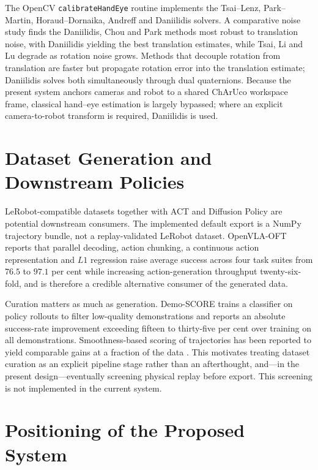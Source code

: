 The OpenCV \texttt{calibrateHandEye} routine implements the Tsai--Lenz,
Park--Martin, Horaud--Dornaika, Andreff and Daniilidis solvers. A comparative
noise study \cite{alihandeye} finds the Daniilidis, Chou and Park methods most
robust to translation noise, with Daniilidis yielding the best translation
estimates, while Tsai, Li and Lu degrade as rotation noise grows. Methods that
decouple rotation from translation are faster but propagate rotation error into
the translation estimate; Daniilidis solves both simultaneously through dual
quaternions. Because the present system anchors cameras and robot to a shared
ChArUco workspace frame, classical hand--eye estimation is largely bypassed;
where an explicit camera-to-robot transform is required, Daniilidis is used.

\section{Dataset Generation and Downstream Policies}
\label{sec:lit-dataset}

LeRobot-compatible datasets together with ACT and Diffusion Policy are
potential downstream consumers. The implemented default export is a NumPy
trajectory bundle, not a replay-validated LeRobot dataset. OpenVLA-OFT \cite{openvlaoft} reports that parallel decoding, action
chunking, a continuous action representation and $L1$ regression raise average
success across four task suites from $76.5$ to $97.1$ per cent while increasing
action-generation throughput twenty-six-fold, and is therefore a credible
alternative consumer of the generated data.

Curation matters as much as generation. Demo-SCORE \cite{demoscore} trains a
classifier on policy rollouts to filter low-quality demonstrations and reports
an absolute success-rate improvement exceeding fifteen to thirty-five per cent
over training on all demonstrations. Smoothness-based scoring of trajectories
has been reported to yield comparable gains at a fraction of the data
. This motivates treating dataset curation as an
explicit pipeline stage rather than an afterthought, and---in the present
design---eventually screening physical replay before export. This screening
is not implemented in the current system.

\section{Positioning of the Proposed System}
\label{sec:positioning}

